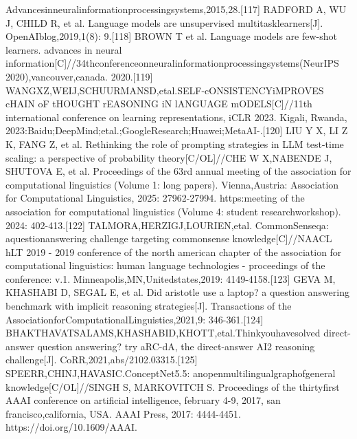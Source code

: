 \documentclass[12pt,a4paper,openright,UTF8]{ctexbook}
\begin{document}
Advancesinneuralinformationprocessingsystems,2015,28.[117] RADFORD A, WU J, CHILD R, et al. Language models are unsupervised multitasklearners[J]. OpenAIblog,2019,1(8): 9.[118] BROWN T et al. Language models are few-shot learners. advances in neural information[C]//34thconferenceonneuralinformationprocessingsystems(NeurIPS 2020),vancouver,canada. 2020.[119] WANGXZ,WEIJ,SCHUURMANSD,etal.SELF-cONSISTENCYiMPROVES cHAIN oF tHOUGHT rEASONING iN lANGUAGE mODELS[C]//11th international conference on learning representations, iCLR 2023. Kigali, Rwanda, 2023:Baidu;DeepMind;etal.;GoogleResearch;Huawei;MetaAI-.[120] LIU Y X, LI Z K, FANG Z, et al. Rethinking the role of prompting strategies in LLM test-time scaling: a perspective of probability theory[C/OL]//CHE W X,NABENDE J, SHUTOVA E, et al. Proceedings of the 63rd annual meeting of the association for computational linguistics (Volume 1: long papers). Vienna,Austria: Association for Computational Linguistics, 2025: 27962-27994. https:meeting of the association for computational linguistics (Volume 4: student researchworkshop). 2024: 402-413.[122] TALMORA,HERZIGJ,LOURIEN,etal. CommonSenseqa: aquestionanswering challenge targeting commonsense knowledge[C]//NAACL hLT 2019 - 2019 conference of the north american chapter of the association for computational linguistics: human language technologies - proceedings of the conference: v.1. Minneapolis,MN,Unitedstates,2019: 4149-4158.[123] GEVA M, KHASHABI D, SEGAL E, et al. Did aristotle use a laptop? a question answering benchmark with implicit reasoning strategies[J]. Transactions of the AssociationforComputationalLinguistics,2021,9: 346-361.[124] BHAKTHAVATSALAMS,KHASHABID,KHOTT,etal.Thinkyouhavesolved direct-answer question answering? try aRC-dA, the direct-answer AI2 reasoning challenge[J]. CoRR,2021,abs/2102.03315.[125] SPEERR,CHINJ,HAVASIC.ConceptNet5.5: anopenmultilingualgraphofgeneral knowledge[C/OL]//SINGH S, MARKOVITCH S. Proceedings of the thirtyfirst AAAI conference on artificial intelligence, february 4-9, 2017, san francisco,california, USA. AAAI Press, 2017: 4444-4451. https://doi.org/10.1609/AAAI.
\end{document}
